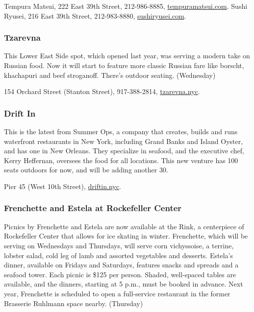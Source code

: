 Tempura Matsui, 222 East 39th Street, 212-986-8885,
\href{http://tempuramatsui.com/}{tempuramatsui.com}. Sushi Ryusei, 216
East 39th Street, 212-983-8880,
\href{https://www.sushiryusei.com/}{sushiryusei.com}.

\hypertarget{tzarevna}{%
\subsubsection{Tzarevna}\label{tzarevna}}

This Lower East Side spot, which opened last year, was serving a modern
take on Russian food. Now it will start to feature more classic Russian
fare like borscht, khachapuri and beef stroganoff. There's outdoor
seating. (Wednesday)

154 Orchard Street (Stanton Street), 917-388-2814,
\href{https://www.tzarevna.nyc/}{tzarevna.nyc}.

\hypertarget{drift-in}{%
\subsubsection{Drift In}\label{drift-in}}

This is the latest from Summer Ops, a company that creates, builds and
runs waterfront restaurants in New York, including Grand Banks and
Island Oyster, and has one in New Orleans. They specialize in seafood,
and the executive chef, Kerry Heffernan, oversees the food for all
locations. This new venture has 100 seats outdoors for now, and will be
adding another 30.

Pier 45 (West 10th Street),
\href{https://www.driftin.nyc/}{driftin.nyc}.

\hypertarget{frenchette-and-estela-at-rockefeller-center}{%
\subsubsection{Frenchette and Estela at Rockefeller
Center}\label{frenchette-and-estela-at-rockefeller-center}}

Picnics by Frenchette and Estela are now available at the Rink, a
centerpiece of Rockefeller Center that allows for ice skating in winter.
Frenchette, which will be serving on Wednesdays and Thursdays, will
serve corn vichyssoise, a terrine, lobster salad, cold leg of lamb and
assorted vegetables and desserts. Estela's dinner, available on Fridays
and Saturdays, features snacks and spreads and a seafood tower. Each
picnic is \$125 per person. Shaded, well-spaced tables are available,
and the dinners, starting at 5 p.m., must be booked in advance. Next
year, Frenchette is scheduled to open a full-service restaurant in the
former Brasserie Ruhlmann space nearby. (Thursday)

